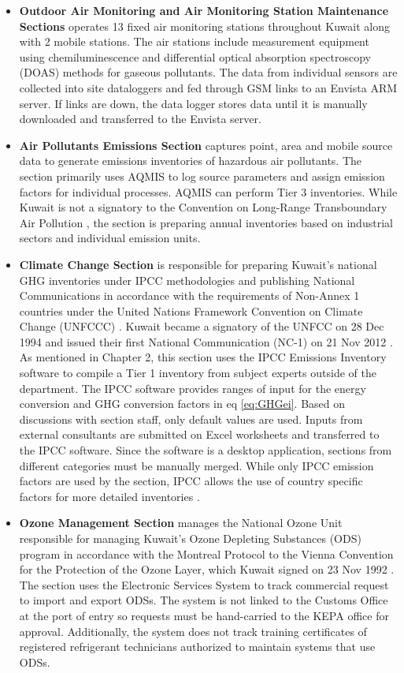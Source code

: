 \begin{itemize}
\item \textbf{Outdoor Air Monitoring and Air Monitoring Station Maintenance Sections}  operates 13 fixed air monitoring stations throughout Kuwait along with 2 mobile stations. The air stations include measurement equipment using  chemiluminescence and differential optical absorption spectroscopy (DOAS) methods for gaseous pollutants. The data from individual sensors are collected into site dataloggers and fed through GSM links to an Envista ARM server. If links are down, the data logger stores data until it is manually downloaded and transferred to the Envista server. 

\item \textbf{Air Pollutants Emissions Section} captures point, area and mobile source data to generate emissions inventories of hazardous air pollutants. The section primarily uses AQMIS to log source parameters and assign emission factors for individual processes. AQMIS can perform Tier 3 inventories. While Kuwait is not a signatory to the Convention on Long-Range Transboundary Air Pollution \citep{UN1979}, the section is preparing annual inventories based on industrial sectors and individual emission units. 

\item \textbf{Climate Change Section} is responsible for preparing Kuwait's  national GHG inventories under IPCC methodologies and publishing National Communications in accordance with the requirements of  Non-Annex 1 countries under the United Nations Framework Convention on Climate Change (UNFCCC) \citep{unfccc2014}. Kuwait became a signatory of the UNFCC on 28 Dec 1994 and issued their first National Communication (NC-1) on 21 Nov 2012 \citep{kepa2012}. As mentioned in Chapter 2, this section uses the IPCC Emissions Inventory software to compile a Tier 1 inventory from subject experts outside of the department. The IPCC software provides ranges of input for the energy conversion and GHG conversion factors in eq \ref{eq:GHGei}. Based on discussions with section staff, only default values are used. Inputs from external consultants are submitted on Excel worksheets and transferred to the IPCC software. Since the software is a desktop application, sections from different categories must be manually merged. While only IPCC emission factors are used by the section, IPCC allows the use of country specific factors for more detailed inventories \citep{ipcc2006}.

\item \textbf{Ozone Management Section} manages the National Ozone Unit responsible for managing Kuwait's Ozone Depleting Substances (ODS) program in accordance with the Montreal Protocol to the Vienna Convention for the Protection of the Ozone Layer, which Kuwait signed on 23 Nov 1992 \citep{un1987}.  The section uses the Electronic Services System to track commercial request to import and export ODSs. The system is not linked to the Customs Office at the port of entry so requests must be hand-carried to the KEPA office for approval. Additionally, the system does not track training certificates of registered refrigerant technicians authorized to maintain systems that use ODSs.
\end{itemize}


